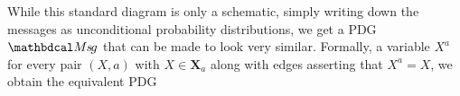 \documentclass[twoside]{article}
\let\cite\citep
\theoremstyle{plain}
\theoremstyle{definition}
\theoremstyle{remark}
\newcommand\mat[1]{\mathbf{#1}}
\newcommand\Msg{\dg{M\mskip-1mus\mskip-2mu g}}
\begin{document}
While this standard diagram is only a schematic,
   simply writing down the messages as unconditional probability
   distributions, we get a PDG $\Msg$ that can be made to look very similar.
Formally, a variable $X^{a}$ for every pair
   $(X,a)$ with $X \in \mat X_a$
along with edges asserting that $X^{a} = X$,
we obtain the equivalent PDG 

\end{document}
